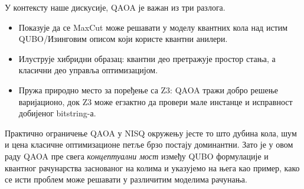 У контексту наше дискусије, QAOA је важан из три разлога.
\begin{itemize}[nosep]
  \item Показује да се MaxCut може решавати у моделу квантних кола над
        истим QUBO/Изинговим описом који користе квантни анилери.
  \item Илуструје хибридни образац: квантни део претражује простор
        стања, а класични део управља оптимизацијом.
  \item Пружа природно место за поређење са Z3: QAOA тражи добро
        решење варијационо, док Z3 може егзактно да провери мале
        инстанце и исправност добијеног bitstring-а.
\end{itemize}

Практично ограничење QAOA у NISQ окружењу јесте то што дубина кола,
шум и цена класичне оптимизационе петље брзо постају доминантни.
Зато је у овом раду QAOA пре свега \emph{концептуални мост} између
QUBO формулације и квантног рачунарства заснованог на колима и указујемо на њега 
као пример, како се исти проблем може решавати у различитим моделима рачунања.
